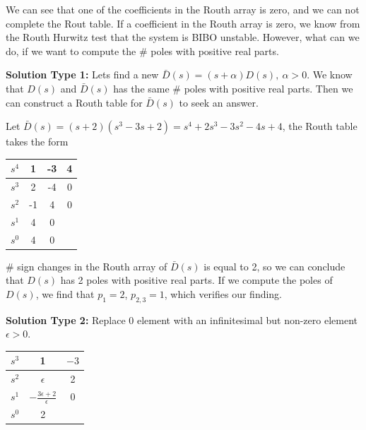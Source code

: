 \documentclass[twoside]{article}
\begin{document}
We can see that one of the coefficients in the Routh array is zero,
and we can not complete the Rout table. If a coefficient in the Routh
array is zero, we know from the Routh Hurwitz test that the system is
BIBO unstable. However, what can we do, if we want to compute the 
$\#$ poles with positive real parts. 

\vspace{12pt}

\textbf{Solution Type 1:} Lets find a new $\bar{D}(s) = (s + \alpha)
D(s), \ \alpha > 0$. We know that $D(s)$ and $\bar{D}(s)$ has the same 
$\#$ poles with positive real parts. Then we can construct a Routh
table for $\bar{D}(s)$ to seek an answer. 

Let $\bar{D}(s) = (s + 2) ( s^3 - 3 s + 2) = s^4 + 2 s^3 - 3 s^2 - 4 s+ 4$, the Routh table takes the form

%
\begin{table}[h]
\begin{center}
\begin{tabular}{|c || c || c c |}
\hline
$s^4$ & 1 & -3 & 4 
\\ \hline
$s^3$ & 2 & -4 & 0
\\ \hline
$s^2$ & -1 & 4 & 0
\\ \hline
$s^1$ & 4 & 0 &
\\ \hline
$s^0$ & 4 & 0 & 
\\ \hline
\end{tabular}
\end{center}
\end{table}
%
$\#$ sign changes in the Routh array of $\bar{D}(s)$ is equal to 2, so
we can conclude that $D(s)$ has 2 poles with positive real parts. If
we compute the poles of $D(s)$, we find that $p_1 = 2$, $p_{2,3} = 1$,
which verifies our finding. 

\vspace{12pt}

\textbf{Solution Type 2:} Replace 0 element with an infinitesimal but
non-zero element $\epsilon >0$.
%
\begin{table}[h]
\begin{center}
\begin{tabular}{|c || c || c  |}
\hline
$s^3$ & 1 & $-3$ 
\\ \hline
$s^2$ & $\epsilon$ & 2
\\ \hline
$s^1$  & $- \frac{3 \epsilon + 2}{\epsilon}$ & 0 
\\ \hline
$s^0$  & 2 & 
\\ \hline
\end{tabular}
\end{center}
\end{table}
\end{document}
